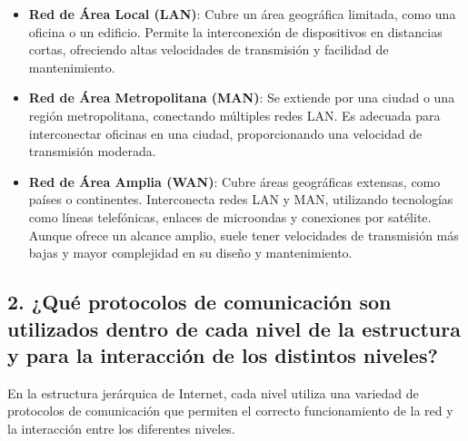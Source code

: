 \documentclass[12pt]{report}
\begin{document}
\begin{itemize}
	\item \textbf{Red de Área Local (LAN)}: Cubre un área geográfica limitada, como una oficina o un edificio. Permite la interconexión de dispositivos en distancias cortas, ofreciendo altas velocidades de transmisión y facilidad de mantenimiento.
	
	\item \textbf{Red de Área Metropolitana (MAN)}: Se extiende por una ciudad o una región metropolitana, conectando múltiples redes LAN. Es adecuada para interconectar oficinas en una ciudad, proporcionando una velocidad de transmisión moderada.
	
	\item \textbf{Red de Área Amplia (WAN)}: Cubre áreas geográficas extensas, como países o continentes. Interconecta redes LAN y MAN, utilizando tecnologías como líneas telefónicas, enlaces de microondas y conexiones por satélite. Aunque ofrece un alcance amplio, suele tener velocidades de transmisión más bajas y mayor complejidad en su diseño y mantenimiento.
\end{itemize}

\subsection*{2. ¿Qué protocolos de comunicación son utilizados dentro de cada nivel de la estructura y para la interacción de los distintos niveles?}

En la estructura jerárquica de Internet, cada nivel utiliza una variedad de protocolos de comunicación que permiten el correcto funcionamiento de la red y la interacción entre los diferentes niveles.
\end{document}
